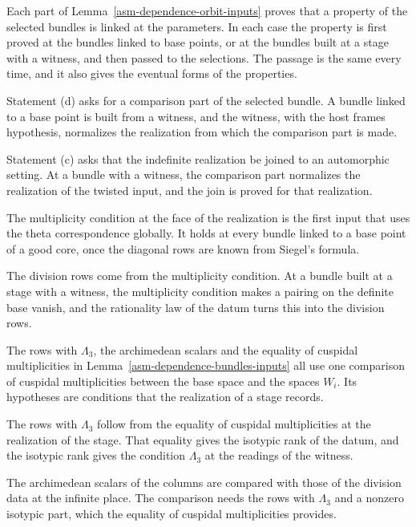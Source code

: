 Each part of Lemma~\ref{asm-dependence-orbit-inputs} proves that a property of
the selected bundles is linked at the parameters. In each case the property is
first proved at the bundles linked to base points, or at the bundles built at a
stage with a witness, and then passed to the selections. The passage is the same
every time, and it also gives the eventual forms of the properties.

Statement (d) asks for a comparison part of the selected bundle. A bundle linked
to a base point is built from a witness, and the witness, with the host frames
hypothesis, normalizes the realization from which the comparison part is made.

Statement (c) asks that the indefinite realization be joined to an automorphic
setting. At a bundle with a witness, the comparison part normalizes the
realization of the twisted input, and the join is proved for that realization.

The multiplicity condition at the face of the realization is the first input
that uses the theta correspondence globally. It holds at every bundle linked to
a base point of a good core, once the diagonal rows are known from Siegel's
formula.

The division rows come from the multiplicity condition. At a bundle built at a
stage with a witness, the multiplicity condition makes a pairing on the definite
base vanish, and the rationality law of the datum turns this into the division
rows.

The rows with $\Lambda_3$, the archimedean scalars and the equality of cuspidal
multiplicities in Lemma~\ref{asm-dependence-bundles-inputs} all use one
comparison of cuspidal multiplicities between the base space and the spaces
$W_i$. Its hypotheses are conditions that the realization of a stage records.

The rows with $\Lambda_3$ follow from the equality of cuspidal multiplicities at
the realization of the stage. That equality gives the isotypic rank of the
datum, and the isotypic rank gives the condition $\Lambda_3$ at the readings of
the witness.

The archimedean scalars of the columns are compared with those of the division
data at the infinite place. The comparison needs the rows with $\Lambda_3$ and a
nonzero isotypic part, which the equality of cuspidal multiplicities provides.

